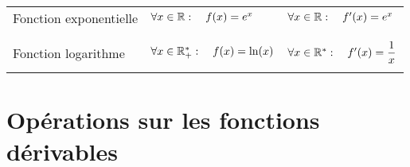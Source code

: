 \documentclass[10pt]{article}
\begin{document}
\begin{tabular}{|l|l|l|}
	Fonction exponentielle     & $\forall x\in\mathbb{R}: \quad f(x)=e^x$                             & $\forall x\in\mathbb{R} : \quad  f'(x)=e^x$                   \\
	                           &                                                              &                                                       \\
	\hline
	                           &                                                              &                                                       \\
	Fonction logarithme        & $\forall x\in\mathbb{R}^*_+: \quad f(x)=\ln(x)$                      & $\forall x\in\mathbb{R}^* : \quad  f'(x)=\dfrac{1}{x}$        \\
	                           &                                                              &                                                       \\
	\hline
\end{tabular}

\newpage

\section{Opérations sur les fonctions dérivables}
\end{document}
